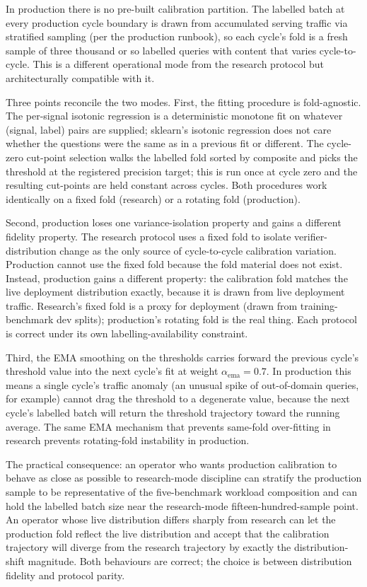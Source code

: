 In production there is no pre-built calibration partition. The labelled batch at every production cycle boundary is drawn from accumulated serving traffic via stratified sampling (per the production runbook), so each cycle's fold is a fresh sample of three thousand or so labelled queries with content that varies cycle-to-cycle. This is a different operational mode from the research protocol but architecturally compatible with it.

Three points reconcile the two modes. First, the fitting procedure is fold-agnostic. The per-signal isotonic regression is a deterministic monotone fit on whatever (signal, label) pairs are supplied; sklearn's isotonic regression does not care whether the questions were the same as in a previous fit or different. The cycle-zero cut-point selection walks the labelled fold sorted by composite and picks the threshold at the registered precision target; this is run once at cycle zero and the resulting cut-points are held constant across cycles. Both procedures work identically on a fixed fold (research) or a rotating fold (production).

Second, production loses one variance-isolation property and gains a different fidelity property. The research protocol uses a fixed fold to isolate verifier-distribution change as the only source of cycle-to-cycle calibration variation. Production cannot use the fixed fold because the fold material does not exist. Instead, production gains a different property: the calibration fold matches the live deployment distribution exactly, because it is drawn from live deployment traffic. Research's fixed fold is a proxy for deployment (drawn from training-benchmark dev splits); production's rotating fold is the real thing. Each protocol is correct under its own labelling-availability constraint.

Third, the EMA smoothing on the thresholds carries forward the previous cycle's threshold value into the next cycle's fit at weight $\alpha_{\text{ema}} = 0.7$. In production this means a single cycle's traffic anomaly (an unusual spike of out-of-domain queries, for example) cannot drag the threshold to a degenerate value, because the next cycle's labelled batch will return the threshold trajectory toward the running average. The same EMA mechanism that prevents same-fold over-fitting in research prevents rotating-fold instability in production.

The practical consequence: an operator who wants production calibration to behave as close as possible to research-mode discipline can stratify the production sample to be representative of the five-benchmark workload composition and can hold the labelled batch size near the research-mode fifteen-hundred-sample point. An operator whose live distribution differs sharply from research can let the production fold reflect the live distribution and accept that the calibration trajectory will diverge from the research trajectory by exactly the distribution-shift magnitude. Both behaviours are correct; the choice is between distribution fidelity and protocol parity.

